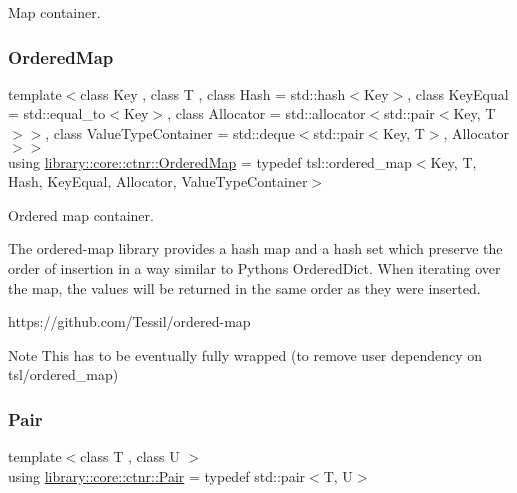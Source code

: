 Map container. 

\mbox{\label{namespacelibrary_1_1core_1_1ctnr_a1c0809231c3bc9fccce602bd7941a36b}} 
\subsubsection{\texorpdfstring{Ordered\+Map}{OrderedMap}}
{\footnotesize\ttfamily template$<$class Key , class T , class Hash  = std\+::hash$<$\+Key$>$, class Key\+Equal  = std\+::equal\+\_\+to$<$\+Key$>$, class Allocator  = std\+::allocator$<$std\+::pair$<$\+Key, T$>$$>$, class Value\+Type\+Container  = std\+::deque$<$std\+::pair$<$\+Key, T$>$, Allocator$>$$>$ \\
using \hyperlink{namespacelibrary_1_1core_1_1ctnr_a1c0809231c3bc9fccce602bd7941a36b}{library\+::core\+::ctnr\+::\+Ordered\+Map} = typedef tsl\+::ordered\+\_\+map$<$Key, T, Hash, Key\+Equal, Allocator, Value\+Type\+Container$>$}



Ordered map container. 

The ordered-\/map library provides a hash map and a hash set which preserve the order of insertion in a way similar to Python\textquotesingle{}s Ordered\+Dict. When iterating over the map, the values will be returned in the same order as they were inserted.

https\+://github.com/\+Tessil/ordered-\/map \begin{DoxyNote}{Note}
This has to be eventually fully wrapped (to remove user dependency on tsl/ordered\+\_\+map) 
\end{DoxyNote}
\mbox{\label{namespacelibrary_1_1core_1_1ctnr_aad6f8de4c0f279c10436d59d4ace74bd}} 
\subsubsection{\texorpdfstring{Pair}{Pair}}
{\footnotesize\ttfamily template$<$class T , class U $>$ \\
using \hyperlink{namespacelibrary_1_1core_1_1ctnr_aad6f8de4c0f279c10436d59d4ace74bd}{library\+::core\+::ctnr\+::\+Pair} = typedef std\+::pair$<$T, U$>$}



